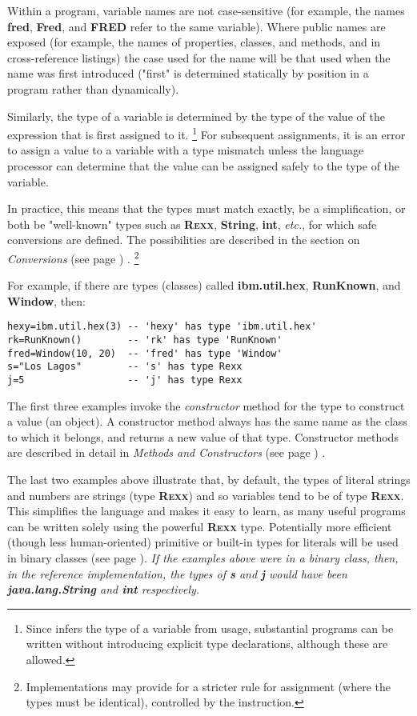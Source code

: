 Within a \nr{} program, variable names are not case-sensitive (for
example, the names \textbf{fred}, \textbf{Fred}, and \textbf{FRED}
refer to the same variable).
Where public names are exposed (for example, the names of properties,
classes, and methods, and in cross-reference listings) the case used for
the name will be that used when the name was first introduced
("first" is determined statically by position in a program rather
than dynamically).
 
Similarly, the type of a \nr{} variable is determined by the type of
the value of the expression that is first assigned to it.
\footnote{
Since \nr{} infers the type of a variable from usage, substantial
programs can be written without introducing explicit type
declarations, although these are allowed.
}
For subsequent assignments, it is an error to assign a value to a
variable with a type mismatch unless the language processor can
determine that the value can be assigned safely to the type of the
variable.
 
In practice, this means that the types must match exactly, be a
simplification, or both be "well-known" types such
as \textbf{R\textsc{exx}}, \textbf{String}, \textbf{int}, \emph{etc.}, for which
safe conversions are defined.  The possibilities are described in the
section on  \emph{Conversions} (see page \pageref{refconv}) .
\footnote{
Implementations may provide for a stricter rule for assignment (where
the types must be identical), controlled by the 
instruction.
}
 
For example, if there are types (classes)
called \textbf{ibm.util.hex}, \textbf{RunKnown},
and \textbf{Window}, then:
\begin{lstlisting}
hexy=ibm.util.hex(3) -- 'hexy' has type 'ibm.util.hex'
rk=RunKnown()        -- 'rk' has type 'RunKnown'
fred=Window(10, 20)  -- 'fred' has type 'Window'
s="Los Lagos"        -- 's' has type Rexx
j=5                  -- 'j' has type Rexx
\end{lstlisting}
 
The first three examples invoke the \emph{constructor} method for the
type to construct a value (an object).  A constructor method always has
the same name as the class to which it belongs, and returns a new value
of that type.  Constructor methods are described in detail in
 \emph{Methods and Constructors} (see page \pageref{refmethcon}) .
 
The last two examples above illustrate that, by default, the types of
literal strings and numbers are \nr{} strings (type \textbf{R\textsc{exx}})
and so variables tend to be of type \textbf{R\textsc{exx}}.
This simplifies the language and makes it easy to learn, as many useful
programs can be written solely using the powerful \textbf{R\textsc{exx}} type.
Potentially more efficient (though less human-oriented) primitive
or built-in types for literals will be used in  binary classes (see page \pageref{refbincla}).
 \emph{If the examples above were in a binary class, then, in the
reference implementation, the types of \textbf{s} and \textbf{j}
would have been \textbf{java.lang.String} and \textbf{int}
respectively.
}
 
